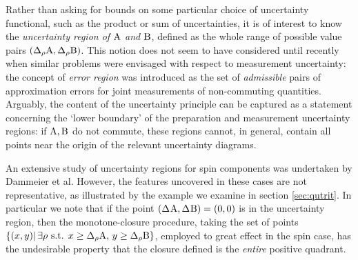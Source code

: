  

Rather than asking for bounds on some particular choice of uncertainty functional, such as the product or sum of uncertainties, it is of interest to know the \emph{uncertainty region of $\operatorname{A}$ and $\operatorname{B}$}, defined as the whole range of possible value pairs $(\sdevr{\opa},\sdevr{\opb})$. This notion does not seem to have considered until recently when similar problems were envisaged with respect to measurement uncertainty\cite{DammeierSchwonnekWerner2015,LiQiao2015,ZhangZhangYu2017,BuschBullock2018}: the concept of {\em error region} was introduced as the set of {\em admissible} pairs of approximation errors for joint measurements of non-commuting quantities\cite{BuschHeinosaari2008}. Arguably, the content of the uncertainty principle can be captured as a statement concerning the `lower boundary' of the preparation and measurement uncertainty regions:
if $\operatorname{A},\operatorname{B}$ do not commute, these regions cannot, in general, contain all points near the origin of the relevant uncertainty diagrams.

An extensive study of uncertainty regions for spin components was undertaken by  Dammeier et al.\cite{DammeierSchwonnekWerner2015}
However, the features uncovered in these cases are not representative, as illustrated by the example we examine in section \ref{sec:qutrit}. In particular we note that if the point $(\sdev{\opa},\sdev{\opb} ) = (0,0)$ is in the uncertainty region, then the monotone-closure procedure, taking the set of points $\{(x,y) |\, \exists \rho \text{ s.t. } x\geq \sdevr{\opa},\, y\geq\sdevr{\opb}\}$, employed to great effect in the spin case, has the undesirable property that the closure defined is the \emph{entire} positive quadrant.

